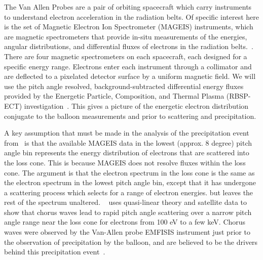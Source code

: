The Van Allen Probes are a pair of orbiting spacecraft which carry instruments to understand electron acceleration in the radiation belts. Of specific interest here is the set of Magnetic Electron Ion Spectrometer (MAGEIS) instruments, which are magnetic spectrometers that provide in-situ measurements of the energies, angular distributions, and differential fluxes of electrons in the radiation belts.~\cite{Blake2013,Spence2014}. There are four magnetic spectrometers on each spacecraft, each designed for a specific energy range. Electrons enter each instrument through a collimator and are deflected to a pixelated detector surface by a uniform magnetic field. We will use the pitch angle resolved, background-subtracted differential energy fluxes provided by the Energetic Particle, Composition, and Thermal Plasma (RBSP-ECT) investigation~\cite{Spence2013}. This gives a picture of the energetic electron distribution conjugate to the balloon measurements and prior to scattering and precipitation.   

A key assumption that must be made in the analysis of the precipitation event from~\cite{Halford2015} is that the available MAGEIS data in the lowest (approx. 8 degree)  pitch angle bin represents the energy distribution of electrons that are scattered into the loss cone. This is because MAGEIS does not resolve fluxes within the loss cone. The argument is that the electron spectrum in the loss cone is the same as the electron spectrum in the lowest pitch angle bin, except that it has undergone a scattering process which selects for a range of electron energies. but leaves the rest of the spectrum unaltered. ~\cite{Thorne2010} uses quasi-linear theory and satellite data to show that chorus waves lead to rapid pitch angle scattering over a narrow pitch angle range near the loss cone for electrons from 100 eV to a few keV. Chorus waves were observed by the Van-Allen probe EMFISIS instrument just prior to the observation of precipitation by the balloon, and are believed to be the drivers behind this precipitation event~\cite{Halford2015}. 

